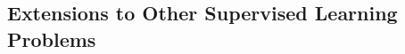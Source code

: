\documentclass[10pt]{article}
\begin{document}



\subsection*{Extensions to Other Supervised Learning Problems}
\end{document}
